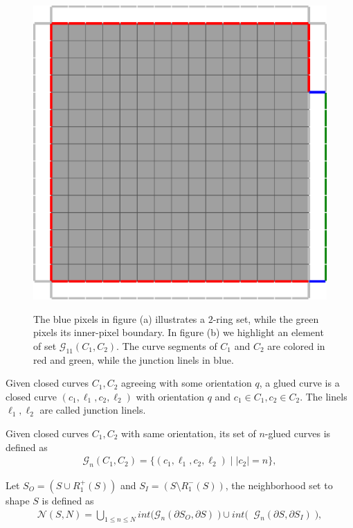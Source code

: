 \documentclass[smallextended]{svjour3}       %
\begin{document}
\begin{figure}[!h]
{	\includegraphics[scale=0.2]{images/local_search/definitions/glued-curve.eps}
	}%
	\caption{The blue pixels in figure (a) illustrates a $2$-ring set, while the green pixels its inner-pixel boundary. In figure (b) we highlight an element of set $\mathcal{G}_{11}(C_1,C_2)$. The curve segments of $C_1$ and $C_2$ are colored in red and green, while the junction linels in blue.}
\end{figure}

\begin{definition}
Given closed curves $C_1,C_2$ agreeing with some orientation $q$, a glued curve is a closed curve  $(c_1,\ell_1,c_2,\ell_2)$ with orientation $q$ and $c_1 \in C_1, c_2 \in C_2$. The linels $\ell_1,\ell_2$ are called junction linels.
\end{definition}

\begin{definition}
Given closed curves $C_1,C_2$ with same orientation, its set of $n$-glued curves is defined as
\begin{align*}
	\mathcal{G}_n(C_1,C_2) = \{ (c_1,\ell_1,c_2,\ell_2) \; | \; |c_2|=n \},
\end{align*}
\end{definition}

Let $S_O = ( S \cup R_1^+(S) ) $ and $S_I = ( S \setminus R_1^-(S) ) $, the neighborhood set to shape $S$ is defined as
\begin{align*}
	\mathcal{N}(S,N) = \bigcup_{1 \leq n \leq N} int \big( \mathcal{G}_{n}(\partial S_O, \partial S) \; \big) \cup int \big( \;  \; \mathcal{G}_{n}(\partial S, \partial S_I) \; \big),
\end{align*}
\end{document}

